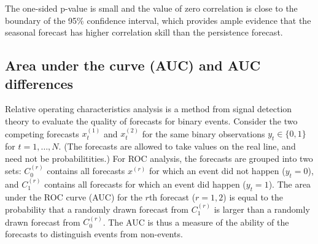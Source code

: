 \documentclass[article]{jss}\usepackage{graphicx, color}
\begin{document}
%
The one-sided p-value is small and the value of zero correlation is close to the boundary of the 95\% confidence interval, which provides ample evidence that the seasonal forecast has higher correlation skill than the persistence forecast.


\subsection{Area under the curve (AUC) and AUC differences}

Relative operating characteristics \citep[ROC, ][and references therein]{mason2002areas} analysis is a method from signal detection theory to evaluate the quality of forecasts for binary events.
Consider the two competing forecasts $x^{(1)}_t$ and $x^{(2)}_t$ for the same binary observations $y_t \in \{0, 1\}$ for $t=1,\dots,N$.
(The forecasts are allowed to take values on the real line, and need not be probabilitities.)
For ROC analysis, the forecasts are grouped into two sets: $C^{(r)}_0$ contains all forecasts $x^{(r)}$ for which an event did not happen ($y_t=0$), and $C^{(r)}_1$ contains all forecasts for which an event did happen ($y_t = 1$).
The area under the ROC curve (AUC) for the $r$th forecast ($r=1,2$) is equal to the probability that a randomly drawn forecast from $C^{(r)}_1$ is larger than a randomly drawn forecast from $C^{(r)}_0$.
The AUC is thus a measure of the ability of the forecasts to distinguish events from non-events.
\end{document}
